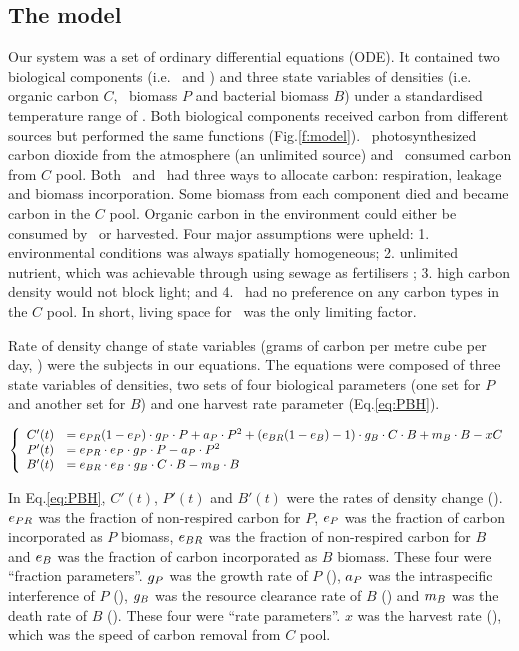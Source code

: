 \documentclass[../thesis.tex]{subfiles} %
\begin{document}
\subsection{The model}

Our system was a set of ordinary differential equations (ODE).  It contained two biological components (i.e. \phy\ and \bac) and three state variables of densities (i.e. organic carbon $C$, \phy\ biomass $P$ and bacterial biomass $B$) under a standardised temperature range of \temp.  Both biological components received carbon from different sources but performed the same functions (Fig.\ref{f:model}). \Phy\ photosynthesized carbon dioxide from the atmosphere (an unlimited source) and \bac\ consumed carbon from $C$ pool.  Both \phy\ and \bac\ had three ways to allocate carbon: respiration, leakage and biomass incorporation. Some biomass from each component died and became carbon in the $C$ pool.  Organic carbon in the environment could either be consumed by \bac\ or harvested.  Four major assumptions were upheld: 1. environmental conditions was always spatially homogeneous; 2. unlimited nutrient, which was achievable through using sewage as fertilisers \autocite{markou2014microalgal}; 3. high carbon density would not block light; and 4. \bac\ had no preference on any carbon types in the $C$ pool.  In short, living space for \phy\ was the only limiting factor.

Rate of density change of state variables (grams of carbon per metre cube per day, \dxdt) were the subjects in our equations.  The equations were composed of three state variables of densities, two sets of four biological parameters (one set for $P$ and another set for $B$) and one harvest rate parameter (Eq.\ref{eq:PBH}).

\begin{equation}\left\{\begin{array}{rl}
    C'(t) &= e_{PR}(1-e_P)\cdot g_P\cdot P +a_P\cdot P^2 +(e_{BR}(1-e_B)-1)\cdot g_B\cdot C\cdot B +m_B\cdot B -xC\\
    P'(t) &= e_{PR}\cdot e_P\cdot g_P\cdot P -a_P\cdot P^2\\
    B'(t) &= e_{BR}\cdot e_B\cdot g_B\cdot C\cdot B -m_B\cdot B
\end{array}\right.\label{eq:PBH}\end{equation}

In Eq.\ref{eq:PBH}, $C'(t)$, $P'(t)$ and $B'(t)$ were the rates of density change (\dxdt).  $e_{PR}$ was the fraction of non-respired carbon for $P$, $e_P$ was the fraction of carbon incorporated as $P$ biomass, $e_{BR}$ was the fraction of non-respired carbon for $B$ and $e_B$ was the fraction of carbon incorporated as $B$ biomass.  These four were ``fraction parameters”.  $g_P$ was the growth rate of $P$ (\dayU), $a_P$ was the intraspecific interference of $P$ (\denI), $g_B$ was the resource clearance rate of $B$  (\denI) and $m_B$ was the death rate of $B$ (\dayU).  These four were ``rate parameters”.  $x$ was the harvest rate (\dayU), which was the speed of carbon removal from $C$ pool.
\end{document}

